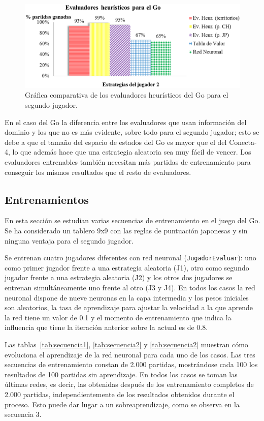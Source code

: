 \begin{figure}[!h]
	\centering
	\includegraphics[scale=0.3]{contenido/cap7/imagenes/heuristicosGojug2.eps}
	\caption[Comparativa de los evaluadores heurísticos del Go (II)]{Gráfica comparativa de los evaluadores heurísticos del Go para el segundo jugador.}
	\label{fig:comparativa_heuristicos_go_jug2}
\end{figure} 

En el caso del Go la diferencia entre los evaluadores que usan información del dominio y los que no es más evidente, sobre todo para el segundo jugador; esto se debe a que el tamaño del espacio de estados del Go es mayor que el del Conecta-4, lo que además hace que una estrategia aleatoria sea muy fácil de vencer.
Los evaluadores entrenables también necesitan más partidas de entrenamiento para conseguir los mismos resultados que el resto de evaluadores.

\subsection{Entrenamientos}
\label{ssec:comparativa_entrenamientos}
En esta sección se estudian varias secuencias de entrenamiento en el juego del Go.
Se ha considerado un tablero 9x9 con las reglas de puntuación japonesas y sin ninguna ventaja para el segundo jugador.

Se entrenan cuatro jugadores diferentes con red neuronal (\texttt{JugadorEvaluar}): uno como primer jugador frente a una estrategia aleatoria (J1), otro como segundo jugador frente a una estrategia aleatoria (J2) y los otros dos jugadores se entrenan simultáneamente uno frente al otro (J3 y J4).
En todos los casos la red neuronal dispone de nueve neuronas en la capa intermedia y los pesos iniciales son aleatorios, la tasa de aprendizaje para ajustar la velocidad a la que aprende la red tiene un valor de 0.1 y el momento de entrenamiento que indica la influencia que tiene la iteración anterior sobre la actual es de 0.8.

Las tablas~\ref{tab:secuencia1}, \ref{tab:secuencia2} y \ref{tab:secuencia2} muestran cómo evoluciona el aprendizaje de la red neuronal para cada uno de los casos.
Las tres secuencias de entrenamiento constan de 2.000 partidas, mostrándose cada 100 los resultados de 100 partidas sin aprendizaje.
En todos los casos se toman las últimas redes, es decir, las obtenidas después de los entrenamiento completos de 2.000 partidas, independientemente de los resultados obtenidos durante el proceso.
Esto puede dar lugar a un sobreaprendizaje, como se observa en la secuencia 3.

